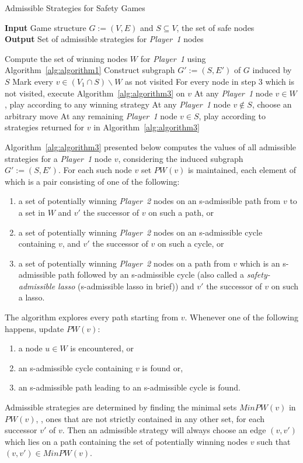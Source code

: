 \begin{algorithm}
	\caption{Admissible Strategies for Safety Games}
	\textbf{Input} Game structure $G := (V,E)$ and $S \subseteq V$, the set of safe nodes \\ 
	\textbf{Output} Set of admissible strategies for \textit{Player~1} nodes
	\label{alg:algorithm2}
	\begin{algorithmic}[1]
		\STATE Compute the set of winning nodes $W$ for \textit{Player~1} using Algorithm~\ref{alg:algorithm1}
		\STATE Construct subgraph $G' := (S,E')$ of $G$ induced by $S$
		\STATE Mark every $v \in (V_{1} \cap S) \backslash W$ as not visited
		\STATE For every node in step 3 which is not visited, execute Algorithm~\ref{alg:algorithm3} on $v$
		\STATE At any \textit{Player~1} node $v \in W$, play according to any winning strategy
		\STATE At any \textit{Player~1} node $v \notin S$, choose an arbitrary move
		\STATE At any remaining \textit{Player~1} node $v \in S$, play according to strategies returned for $v$ in Algorithm~\ref{alg:algorithm3}
	\end{algorithmic}
\end{algorithm}

Algorithm~\ref{alg:algorithm3} presented below computes the values of
all admissible strategies for a \textit{Player~1} node $v$,
considering the induced subgraph $G' := (S,E')$. For each such node
$v$ set $PW(v)$ is maintained, each element of which is a pair
consisting of one of the following:
\begin{enumerate} 
	\item a set of potentially winning \textit{Player~2} nodes on an s-admissible path from $v$ to a set in $W$ and $v'$ the successor of $v$ on such a path, or
	\item a set of potentially winning \textit{Player~2} nodes on an s-admissible cycle containing $v$, and $v'$ the successor of $v$ on such a cycle, or
	\item a set of potentially winning \textit{Player~2} nodes on a path from $v$ which is an s-admissible path followed by an s-admissible cycle (also called a \textit{safety-admissible lasso} (s-admissible lasso in brief)) and $v'$ the successor of $v$ on such a lasso.
\end{enumerate}
The algorithm explores every path starting from $v$.  Whenever one of the following happens, update $PW(v)$: 
\begin{enumerate} 
	\item a node $u \in W$ is encountered, or
	\item an s-admissible cycle containing $v$ is found or,
	\item an s-admissible path leading to an s-admissible cycle is found.
\end{enumerate} 
Admissible strategies are determined by finding the minimal sets $MinPW(v)$ in $PW(v)$, \ie, ones that are not strictly contained in any other set, for each successor $v'$ of $v$. Then an admissible strategy will always choose an edge $(v,v')$ which lies on a path containing the set of potentially winning nodes $v$ such that $(v,v') \in MinPW(v)$.

